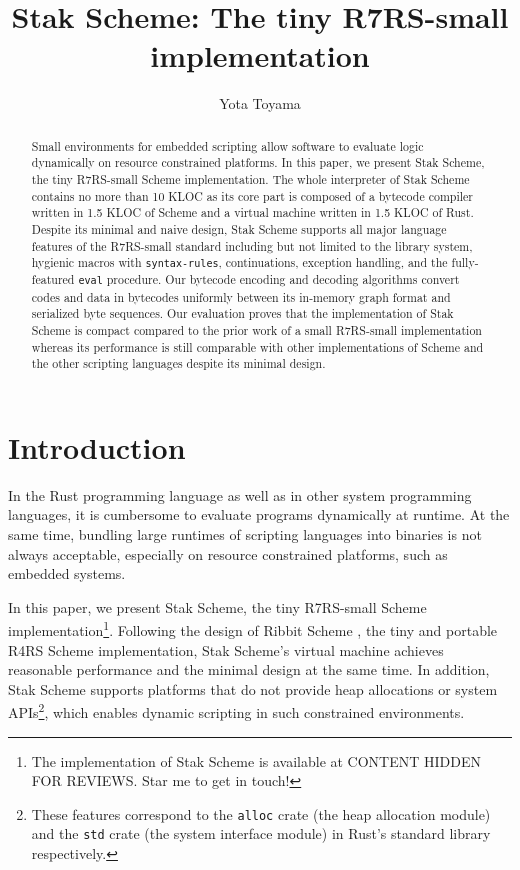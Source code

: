 \documentclass[sigplan, anonymous, review]{acmart}
\newcommand{\draft}[1]{CONTENT HIDDEN FOR REVIEWS}
\begin{document}
\title{Stak Scheme: The tiny R7RS-small implementation}
\author{Yota Toyama}

\begin{abstract}
  Small environments for embedded scripting allow software to
  evaluate logic dynamically on resource constrained platforms.
  In this paper, we present Stak Scheme, the tiny R7RS-small
  Scheme implementation.
  The whole interpreter of Stak Scheme contains no more than 10 KLOC as
  its core part is composed of a bytecode compiler written in 1.5 KLOC of Scheme
  and a virtual machine written in 1.5 KLOC of Rust.
  Despite its minimal and naive design, Stak Scheme
  supports all major language features of the R7RS-small standard including
  but not limited to the library system, hygienic macros with
  \texttt{syntax-rules}, continuations, exception handling, and the
  fully-featured \texttt{eval} procedure.
  Our bytecode encoding and decoding algorithms convert codes and
  data in bytecodes uniformly
  between its in-memory graph format and serialized byte sequences.
  Our evaluation proves that the implementation of Stak Scheme is
  compact compared to the prior work of a small R7RS-small implementation
  whereas its performance is still
  comparable with other implementations of Scheme and the other
  scripting languages despite its minimal design.
\end{abstract}

\maketitle

\section{Introduction}

In the Rust programming language as well as in other system
programming languages, it is cumbersome to evaluate programs
dynamically at runtime. At the same time, bundling large runtimes of
scripting languages into binaries is not always acceptable,
especially on resource constrained platforms, such as embedded systems.

In this paper, we present Stak Scheme, the tiny R7RS-small Scheme
implementation\footnote{
  The implementation of Stak Scheme is available at
  \draft{\url{https://github.com/raviqqe/stak}}. Star me to get in touch!
}.
Following the design of Ribbit Scheme
\cite{ribbit2023}, the tiny and
portable R4RS Scheme implementation, Stak Scheme's virtual machine
achieves reasonable performance and the minimal design
at the same time.
In addition, Stak Scheme supports platforms that do not provide
heap allocations or system APIs\footnote{
  These features correspond to the \texttt{alloc}
  crate (the heap allocation module) and the \texttt{std} crate (the
  system interface module) in Rust's standard library respectively.
}, which enables dynamic scripting in such constrained environments.
\end{document}
